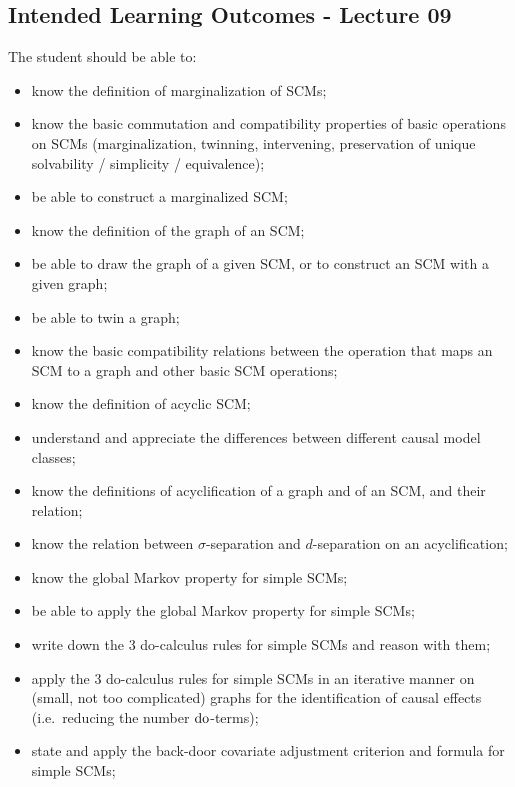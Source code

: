 \subsection*{Intended Learning Outcomes - Lecture 09}

The student should be able to:
\begin{itemize}
\item know the definition of marginalization of SCMs;
\item know the basic commutation and compatibility properties of basic operations on SCMs (marginalization, twinning, intervening, preservation of unique solvability / simplicity / equivalence);
\item be able to construct a marginalized SCM;
\item know the definition of the graph of an SCM;
\item be able to draw the graph of a given SCM, or to construct an SCM with a given graph;
\item be able to twin a graph;
\item know the basic compatibility relations between the operation that maps an SCM to a graph and other basic SCM operations;
\item know the definition of acyclic SCM;
\item understand and appreciate the differences between different causal model classes;
\item know the definitions of acyclification of a graph and of an SCM, and their relation;
\item know the relation between $\sigma$-separation and $d$-separation on an acyclification;
\item know the global Markov property for simple SCMs;
\item be able to apply the global Markov property for simple SCMs;
\item write down the 3 do-calculus rules for simple SCMs and reason with them;
\item apply the 3 do-calculus rules for simple SCMs in an iterative manner on (small, not too complicated) graphs for the identification of causal effects (i.e.\ reducing the number $\operatorname{do}$-terms);
\item state and apply the back-door covariate adjustment criterion and formula for simple SCMs;
\end{itemize}
